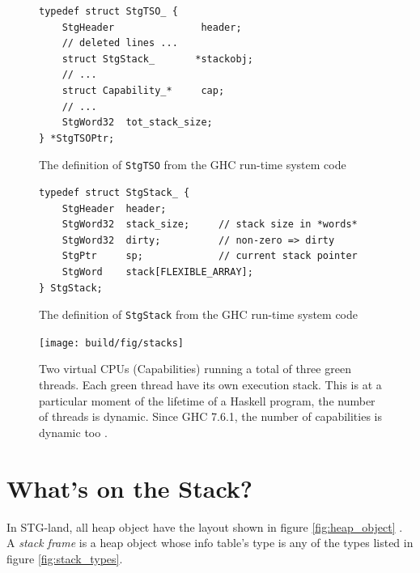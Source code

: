 \begin{figure}
\begin{mdframed}
  \begin{verbatim}
typedef struct StgTSO_ {
    StgHeader               header;
    // deleted lines ...
    struct StgStack_       *stackobj;
    // ...
    struct Capability_*     cap;
    // ...
    StgWord32  tot_stack_size;
} *StgTSOPtr;
  \end{verbatim}
  \caption{The definition of \texttt{StgTSO} from the GHC run-time system
code}
  \label{fig:tso_definition}
\end{mdframed}
\end{figure}

\begin{figure}
\begin{mdframed}
  \begin{verbatim}
typedef struct StgStack_ {
    StgHeader  header;
    StgWord32  stack_size;     // stack size in *words*
    StgWord32  dirty;          // non-zero => dirty
    StgPtr     sp;             // current stack pointer
    StgWord    stack[FLEXIBLE_ARRAY];
} StgStack;
  \end{verbatim}
  \caption{The definition of \texttt{StgStack} from the GHC run-time system
code}
  \label{fig:stack_definition}
\end{mdframed}
\end{figure}

\begin{figure}
  \centering
  \texttt{[image: build/fig/stacks]}
  \caption{Two virtual CPUs (Capabilities) running a total of three
green threads. Each green thread have its own execution stack.
This is at a particular moment of the lifetime of a Haskell program,
the number of threads is dynamic. Since GHC 7.6.1, the number of
capabilities is dynamic too \cite{haskell_org_release_7.6.1}.}
  \label{fig:stacks}
\end{figure}

\section{What's on the Stack?} \label{sec:whats_on_the_stack}

In STG-land, all heap object have the layout shown in figure
\ref{fig:heap_object} \cite{commentary_heap_objects}.
A \emph{stack frame} is a heap object whose
info table's type is any of the types listed in figure \ref{fig:stack_types}.

